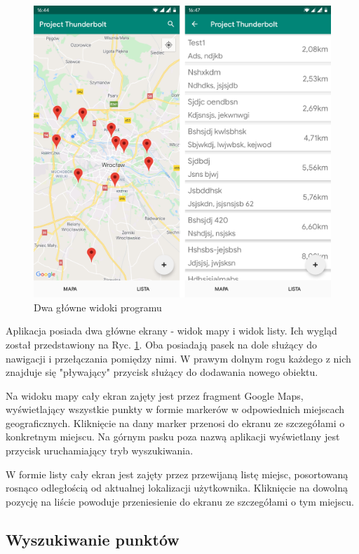 \documentclass[polish,polish,a4paper,12pt]{article}
\begin{document}
	\begin{figure}[H]
		\centering
		\includegraphics[width = \textwidth]{screenshot-main}
		\caption{Dwa główne widoki programu}
		\label{fig:screenshotmain}
	\end{figure}

	Aplikacja posiada dwa główne ekrany - widok mapy i widok listy. Ich wygląd został przedstawiony na Ryc. \ref{fig:screenshotmain}. Oba posiadają pasek na dole służący do nawigacji i przełączania pomiędzy nimi. W prawym dolnym rogu każdego z nich znajduje się "pływający" przycisk służący do dodawania nowego obiektu.

	Na widoku mapy cały ekran zajęty jest przez fragment Google Maps, wyświetlający wszystkie punkty w formie markerów w odpowiednich miejscach geograficznych. Kliknięcie na dany marker przenosi do ekranu ze szczegółami o konkretnym miejscu. Na górnym pasku poza nazwą aplikacji wyświetlany jest przycisk uruchamiający tryb wyszukiwania.

	W formie listy cały ekran jest zajęty przez przewijaną listę miejsc, posortowaną rosnąco odległością od aktualnej lokalizacji użytkownika. Kliknięcie na dowolną pozycję na liście powoduje przeniesienie do ekranu ze szczegółami o tym miejscu.

	\subsection{Wyszukiwanie punktów}
\end{document}
